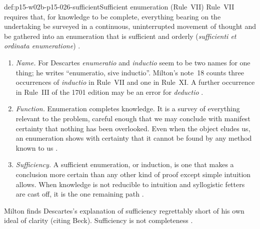 \begin{hbdefinition}{def:p15-w02b-p15-026-sufficient}{Sufficient enumeration (Rule~VII)}
Rule~VII requires that, for knowledge to be complete, everything bearing
on the undertaking be surveyed in a continuous, uninterrupted movement of
thought and be gathered into an enumeration that is sufficient and
orderly (\emph{sufficienti et ordinata enumeratione})
\cite[p.~27]{Milton2011InductionBeforeHume}.
\begin{enumerate}
\item \emph{Name.} For Descartes \emph{enumeratio} and \emph{inductio}
  seem to be two names for one thing; he writes ``enumeratio, sive
  inductio''. Milton's note~18 counts three occurrences of
  \emph{inductio} in Rule~VII and one in Rule~XI. A further occurrence in
  Rule~III of the 1701 edition may be an error for \emph{deductio}
  \cite[p.~27]{Milton2011InductionBeforeHume}.
\item \emph{Function.} Enumeration completes knowledge. It is a survey of
  everything relevant to the problem, careful enough that we may conclude
  with manifest certainty that nothing has been overlooked. Even when the
  object eludes us, an enumeration shows with certainty that it cannot be
  found by any method known to us \cite[p.~28]{Milton2011InductionBeforeHume}.
\item \emph{Sufficiency.} A sufficient enumeration, or induction, is one
  that makes a conclusion more certain than any other kind of proof except
  simple intuition allows. When knowledge is not reducible to intuition and
  syllogistic fetters are cast off, it is the one remaining path
  \cite[p.~28]{Milton2011InductionBeforeHume}.
\end{enumerate}
\end{hbdefinition}

Milton finds Descartes's explanation of sufficiency regrettably short of
his own ideal of clarity (citing Beck). Sufficiency is not completeness
\cite[pp.~28--29]{Milton2011InductionBeforeHume}.

